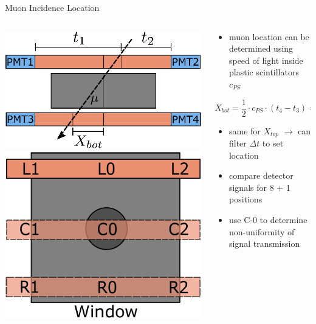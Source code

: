 \documentclass[aspectratio=169]{beamer}
\begin{document}
	\begin{frame}{Muon Incidence Location}
		\begin{columns}
			\begin{column}{.5\textwidth}
				\centering
				\includegraphics[width=.7\textwidth]{pictures/positional.pdf}
				\includegraphics[width=.5\textwidth]{pictures/locations_cosmics.pdf}
			\end{column}
		
		
			\begin{column}{.5\textwidth}
				\begin{itemize}
					\item muon location can be determined using speed of light inside plastic scintillators $c_{PS}$
				\end{itemize}
			\begin{equation*}
				X_{bot} =  \frac{1}{2} \cdot c_{PS} \cdot (t_4 - t_3) = \frac{1}{2} \cdot c_{PS} \cdot \Delta t_{43}
			\end{equation*}
		
			\begin{itemize}
				\item same for $X_{top}$ $\rightarrow$ can filter $\Delta t$ to set location
				\item compare detector signals for 8 + 1 positions
				\item use C-0 to determine non-uniformity of signal transmission
			\end{itemize}
		
		
			\end{column}
		\end{columns}

	\end{frame}
\end{document}
